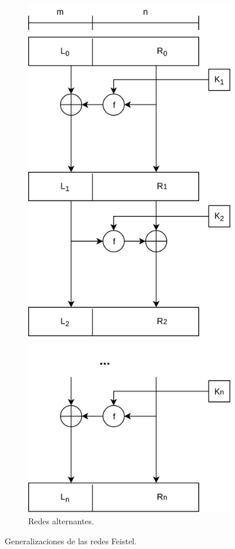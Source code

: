 \begin{figure}[H]
\begin{subfigure}{0.45\textwidth}
\begin{center}
      \includegraphics[width=0.5\linewidth]
        {../../../../diagramas_comunes/redes_feistel/alternantes.png}
      \caption{Redes alternantes.}
      \label{feistel:alternantes}
    \end{center}
  \end{subfigure}
  \caption{Generalizaciones de las redes Feistel.}
  \label{feistel:generalizaciones}
\end{figure}
